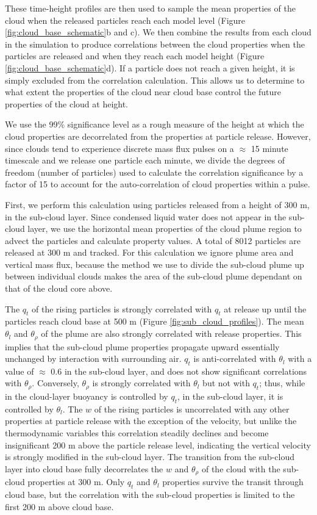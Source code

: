 \documentclass[acp]{copernicus}
\begin{document}
These time-height profiles are then used to sample the mean properties of the 
cloud when the released particles reach each model level (Figure 
\ref{fig:cloud_base_schematic}b and c).  We then combine the results from each 
cloud in the simulation to produce correlations between the cloud properties 
when the particles are released and when they reach each model height (Figure 
\ref{fig:cloud_base_schematic}d).  If a particle does not reach a given 
height, it is simply excluded from the correlation calculation.  This allows us 
to determine to what extent the properties of the cloud near cloud base control 
the future properties of the cloud at height.

We use the 99\% significance level as a rough measure of the height at which 
the cloud properties are decorrelated from the properties at particle release.  
However, since clouds tend to experience discrete mass flux pulses on a 
$\approx$ 15 minute timescale and we release one particle each minute, we 
divide the degrees of freedom (number of particles) used to calculate the 
correlation significance by a factor of 15 to account for the auto-correlation 
of cloud properties within a pulse.

First, we perform this calculation using particles released from a height of 
300 m, in the sub-cloud layer.  Since condensed liquid water does not appear in 
the sub-cloud layer, we use the horizontal mean properties of the cloud plume 
region to advect the particles and calculate property values.  A total of 8012 
particles are released at 300 m and tracked.  For this calculation we ignore 
plume area and vertical mass flux, because the method we use to divide the 
sub-cloud plume up between individual clouds makes the area of the sub-cloud 
plume dependant on that of the cloud core above.

The $q_t$ of the rising particles is strongly correlated with $q_t$ at release 
up until the particles reach cloud base at 500 m (Figure 
\ref{fig:sub_cloud_profiles}).  The mean $\theta_l$ and $\theta_\rho$ of 
the plume are also strongly correlated with release properties.  This implies 
that the sub-cloud plume properties propagate upward essentially unchanged by 
interaction with surrounding air.  $q_t$ is anti-correlated with $\theta_l$ 
with a value of $\approx$ 0.6 in the sub-cloud layer, and does not show 
significant correlations with $\theta_\rho$.  Conversely, $\theta_\rho$ is 
strongly correlated with $\theta_l$ but not with $q_t$; thus, while in the 
cloud-layer buoyancy is controlled by $q_t$, in the sub-cloud layer, it is 
controlled by $\theta_l$.  The $w$ of the rising particles is uncorrelated 
with any other properties at particle release with the exception of the 
velocity, but unlike the thermodynamic variables this correlation steadily 
declines and become insignificant 200 m above the particle release level, 
indicating the vertical velocity is strongly modified in the sub-cloud layer.  
The transition from the sub-cloud layer into cloud base fully decorrelates the 
$w$ and $\theta_\rho$ of the cloud with the sub-cloud properties at 300 m.
Only $q_t$ and $\theta_l$ properties survive the transit through cloud base, 
but the correlation with the sub-cloud properties is limited to the first 200 m 
above cloud base.
\end{document}
